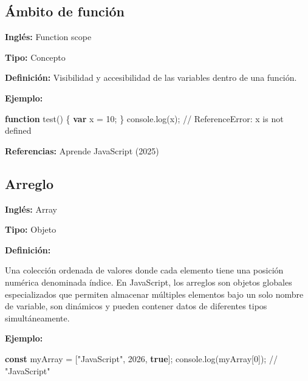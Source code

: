 \documentclass[
  letterpaper,
  DIV=11,
  numbers=noendperiod]{scrreprt}
\newenvironment{Shaded}{\begin{snugshade}}{\end{snugshade}}
\newcommand{\BuiltInTok}[1]{\textcolor[rgb]{0.00,0.23,0.31}{#1}}
\newcommand{\CommentTok}[1]{\textcolor[rgb]{0.37,0.37,0.37}{#1}}
\newcommand{\DecValTok}[1]{\textcolor[rgb]{0.68,0.00,0.00}{#1}}
\newcommand{\FunctionTok}[1]{\textcolor[rgb]{0.28,0.35,0.67}{#1}}
\newcommand{\KeywordTok}[1]{\textcolor[rgb]{0.00,0.23,0.31}{\textbf{#1}}}
\newcommand{\NormalTok}[1]{\textcolor[rgb]{0.00,0.23,0.31}{#1}}
\newcommand{\OperatorTok}[1]{\textcolor[rgb]{0.37,0.37,0.37}{#1}}
\newcommand{\StringTok}[1]{\textcolor[rgb]{0.13,0.47,0.30}{#1}}
\let\oldsubsection\subsection
\renewcommand{\subsection}{\phantomsection\oldsubsection}
\begin{document}
\subsection*{Ámbito de función}\label{glos-ambito_de_funcion}

\textbf{Inglés:} Function scope

\textbf{Tipo:} Concepto

\textbf{Definición:} Visibilidad y accesibilidad de las variables dentro
de una función.

\textbf{Ejemplo:}

\begin{Shaded}
\begin{Highlighting}[]
\KeywordTok{function} \FunctionTok{test}\NormalTok{() \{}
    \KeywordTok{var}\NormalTok{ x }\OperatorTok{=} \DecValTok{10}\OperatorTok{;}
\NormalTok{\}}
\BuiltInTok{console}\OperatorTok{.}\FunctionTok{log}\NormalTok{(x)}\OperatorTok{;} \CommentTok{// ReferenceError: x is not defined}
\end{Highlighting}
\end{Shaded}

\textbf{Referencias:} Aprende JavaScript (2025)

\subsection*{Arreglo}\label{glos-arreglo}

\textbf{Inglés:} Array

\textbf{Tipo:} Objeto

\textbf{Definición:}

Una colección ordenada de valores donde cada elemento tiene una posición
numérica denominada índice. En JavaScript, los arreglos son objetos
globales especializados que permiten almacenar múltiples elementos bajo
un solo nombre de variable, son dinámicos y pueden contener datos de
diferentes tipos simultáneamente.

\textbf{Ejemplo:}

\begin{Shaded}
\begin{Highlighting}[]
\KeywordTok{const}\NormalTok{ myArray }\OperatorTok{=}\NormalTok{ [}\StringTok{"JavaScript"}\OperatorTok{,} \DecValTok{2026}\OperatorTok{,} \KeywordTok{true}\NormalTok{]}\OperatorTok{;}
\BuiltInTok{console}\OperatorTok{.}\FunctionTok{log}\NormalTok{(myArray[}\DecValTok{0}\NormalTok{])}\OperatorTok{;} \CommentTok{// "JavaScript"}
\end{Highlighting}
\end{Shaded}
\end{document}
